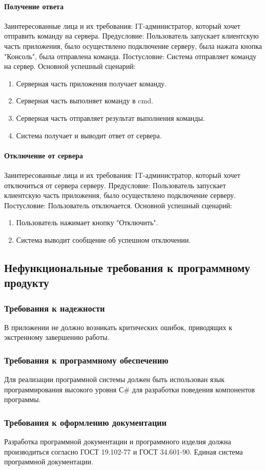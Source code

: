 \paragraph{Получение ответа}
Заинтересованные лица и их требования: IT-администратор, который хочет отправить команду на сервера.
Предусловие: Пользователь запускает клиентскую часть приложения,  было осуществлено подключение серверу, была нажата кнопка "Консоль", была отправлена команда.
Постусловие: Система отправляет команду на сервер.
Основной успешный сценарий:
\begin{enumerate}
	\item Серверная часть приложения получает команду.
	\item Серверная часть выполняет команду в cmd.
	\item Серверная часть отправляет результат выполнения команды.
	\item Система получает и выводит ответ от сервера.
\end{enumerate}

\paragraph{Отключение от сервера}
Заинтересованные лица и их требования: IT-администратор, который хочет отключиться от сервера серверу.
Предусловие: Пользователь запускает клиентскую часть приложения, было осуществлено подключение серверу.
Постусловие: Пользователь отключается.
Основной успешный сценарий:
\begin{enumerate}
	\item Пользователь нажимает кнопку "Отключить".
	\item Система выводит сообщение об успешном отключении.
\end{enumerate}

\subsection{Нефункциональные требования к программному продукту}
\subsubsection{Требования к надежности}
В приложении не должно возникать критических ошибок, приводящих
к экстренному завершению работы.

\subsubsection{Требования к программному обеспечению}
Для реализации программной системы должен быть использован язык программирования высокого уровня С\#  для разработки поведения компонентов программы.

\subsubsection{Требования к оформлению документации}
Разработка программной документации и программного изделия должна производиться согласно ГОСТ 19.102-77 и ГОСТ 34.601-90. Единая система программной документации.
